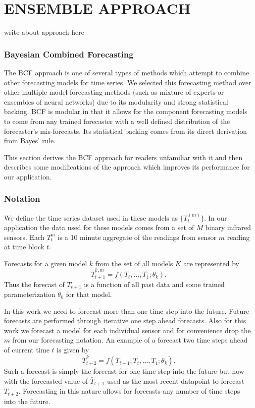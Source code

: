 \chapter{ENSEMBLE APPROACH}
\label{ch:BCF}
write about approach here

\subsection{Bayesian Combined Forecasting}
The BCF approach \cite{Petridis2001} is one of several types of methods which attempt to combine other forecasting models for time series. We selected this forecasting method over other multiple model forecasting methods (such as mixture of experts or ensembles of neural networks) due to its modularity and strong statistical backing.  BCF is modular in that it allows for the component forecasting models to come from any trained forecaster with a well defined distribution of the forecaster's mis-forecasts.  Its statistical backing comes from its direct derivation from Bayes' rule.

This section derives the BCF approach for readers unfamiliar with it and then describes some modifications of the approach which improves its performance for our application.

\subsection{Notation}
We define the time series dataset used in these models as $\{T_{t}^{(m)}\}$.  In our application the data used for these models comes from a set of $M$ binary infrared sensors.  Each $T_{t}^{m}$ is a 10 minute aggregate of the readings from sensor $m$ reading at time block $t$.  

Forecasts for a given model $k$ from the set of all models $K$ are represented by 
\begin{equation}
\bar{T}_{t + 1}^{k, m} = f(T_{t}, ..., T_{1}; \theta_{k}).
\end{equation}
\noindent
Thus the forecast of $T_{t + 1}$ is a function of all past data and some trained parameterization $\theta_{k}$ for that model. 

In this work we need to forecast more than one time step into the future.  Future forecasts are performed through iterative one step ahead forecasts.  Also for this work we forecast a model for each individual sensor and for convenience drop the $m$ from our forecasting notation.  An example of a forecast two time steps ahead of current time $t$ is given by 
\begin{equation}
\bar{T}_{t + 2}^{k} = f(\bar{T}_{t + 1}, T_{t}, ..., T_{1}; \theta_{k}).
\end{equation}
\noindent
Such a forecast is simply the forecast for one time step into the future but now with the forecasted value of $\bar{T}_{t + 1}$ used as the most recent datapoint to forecast $\bar{T}_{t + 2}$.  Forecasting in this nature allows for forecasts any number of time steps into the future. 

